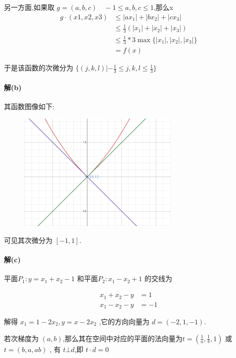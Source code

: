 \documentclass[a4paper]{article}
\begin{document}
另一方面,如果取 $g = (a,b,c) \quad -1 \leq a,b,c \leq 1 $,那么x
 \[\begin{aligned}
    g \cdot (x1,x2,x3)  & \leq |ax_1| + |bx_2| + |cx_3|  \\
    &\leq \frac{1}{3}(|x_1| + |x_2| + |x_3|)  \\
    &\leq \frac{1}{3} * 3 \max\{|x_1|,|x_2|,|x_3|\}  \\
    & = f(x) 
\end{aligned}\]


于是该函数的次微分为 \(\{(j,k,l) | -\frac{1}{3} \leq j,k,l \leq \frac{1}{3}\}\)

\paragraph{解(b)}
其函数图像如下:

\begin{figure}[H]
    \centering
    \includegraphics[width=0.7\textwidth]{pic/p5s2.png}
\end{figure}

可见其次微分为 \([-1,1]\).
\paragraph{解(c)}

平面\(P_1 : y = x_1 + x_2 - 1\) 和平面\(P_2 : x_1 - x_2 + 1\) 的交线为

\[ \begin{aligned}
    x_1 + x_2 - y & = 1 \\
    x_1 - x_2 - y & = -1
\end{aligned}\]

解得 \( x_1 = 1-2x_2, y = x-2x_2\) ,它的方向向量为 \(d= (-2,1,-1)\).

若次梯度为 \((a,b)\),那么其在空间中对应的平面的法向量为\( t = (\frac{1}{a},\frac{1}{b},1)\) 或\(t = (b,a,ab)\) , 有 \(t \bot d\),即 \(t \cdot d = 0\)
\end{document}
